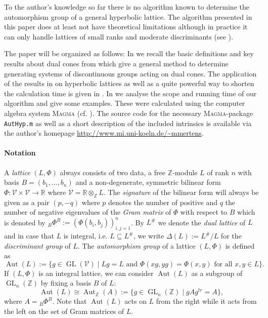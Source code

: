 \documentclass[10pt, preprint]{elsarticle}
\theoremstyle{definition}
\theoremstyle{definition}
\newcommand{\Z}{\mathbb{Z}}
\newcommand{\R}{\mathbb{R}}
\newcommand{\V}{\mathcal{V}}
\newcommand{\Aut}{\operatorname{Aut}}
\newcommand{\GL}{\operatorname{GL}}
\begin{document}
To the author's knowledge so far there is no algorithm known to determine the automorphism group of a general hyperbolic lattice. The algorithm presented in this paper does at least not have theoretical limitations although in practice it can only handle lattices of small ranks and moderate discriminants (see ).

The paper will be organized as follows: In  we recall the basic definitions and key results about dual cones from \cite{Opg01} which give a general method to determine generating systems of discontinuous groups acting on dual cones. The application of the results in  on hyperbolic lattices as well as a quite powerful way to shorten the calculation time is given in . In  we analyse the scope and running time of our algorithm and give some examples. These were calculated using the computer algebra system \textsc{Magma} (cf. \cite{Magma}). The source code for the necessary \textsc{Magma}-package \texttt{AutHyp.m} as well as a short description of the included intrinsics is available via the author's homepage \url{http://www.mi.uni-koeln.de/~mmertens}.

\paragraph*{Notation}\label{parNot}
A \emph{lattice} $(L,\Phi)$ always consists of two data, a free $\Z$-module $L$ of rank $n$ with basis $B=(b_1,\dots ,b_n)$ and a non-degenerate, symmetric bilinear form $\Phi:\V\times \V\rightarrow \R$ where $\V=\R\otimes_\Z L$. The \emph{signature} of the bilinear form will always be given as a pair $(p,-q)$ where $p$ denotes the number of positive and $q$ the number of negative eigenvalues of the \emph{Gram matrix} of $\Phi$ with respect to $B$ which is denoted by ${}_B\Phi^B:=(\Phi(b_i,b_j))_{i,j=1}^n$. By $L^\#$ we denote the \emph{dual lattice} of $L$ and in case that $L$ is integral, i.e. $L\subseteq L^\#$, we write $\Delta(L):=L^\#/L$ for the \emph{discriminant group} of $L$. The \emph{automorphism group} of a lattice $(L,\Phi)$ is defined as 
\[\Aut(L):=\{g\in\GL(\V)\mid Lg=L\text{ and } \Phi(xg,yg)=\Phi(x,y)\text{ for all }x,y\in L\}.\]
If $(L,\Phi)$ is an integral lattice, we can consider $\Aut(L)$ as a subgroup of $\GL_n(\Z)$ by fixing a basis $B$ of $L$:
\[\Aut(L)\cong\Aut_\Z(A):=\{g\in\GL_n(\Z)\mid gAg^{tr} = A\},\]
where $A={}_B\Phi^B$. Note that $\Aut(L)$ acts on $L$ from the right while it acts from the left on the set of Gram matrices of $L$.
\end{document}
